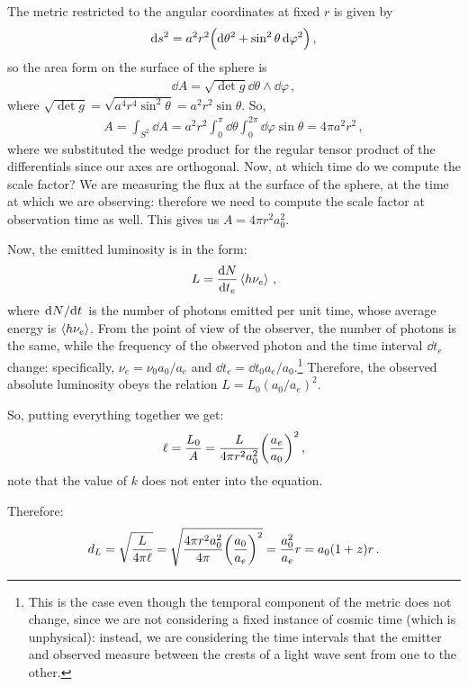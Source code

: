 \documentclass[main.tex]{subfiles}
\begin{document}
The metric restricted to the angular coordinates at fixed \(r\) is given by 
%
\begin{align}
\dd{s^2} = a^2 r^2 \qty(\dd{\theta^2} + \sin^2\theta \dd{\varphi^2})
\,,
\end{align}
%
so the area form on the surface of the sphere is 
%
\begin{align}
\dd{A} = \sqrt{ \det g} \dd{\theta } \wedge \dd{\varphi }
\,,
\end{align}
%
where \(\sqrt{ \det g} = \sqrt{a^{4} r^{4} \sin^2\theta } = a^2r^2 \sin \theta \). 
So,
%
\begin{align}
A = \int_{S^{2}}  \dd{A} = a^2r^2 \int_{0}^{\pi } \dd{\theta } \int_{0}^{2 \pi } \dd{\varphi } \sin \theta = 4 \pi a^2r^2 
\,,
\end{align}
%
where we substituted the wedge product for the regular tensor product of the differentials since our axes are orthogonal.
Now, at which time do we compute the scale factor? We are measuring the flux at the surface of the sphere, at the time at which we are observing: therefore we need to compute the scale factor at observation time as well. This gives us \(A = 4 \pi r^2a_0^2\).

Now, the emitted luminosity is in the form: 
%
\begin{align}
L = \dv{N}{t_{e}} \expval{h \nu_{e} }
\,,
\end{align}
%
where \(\dv*{N}{t}\) is the number of photons emitted per unit time, whose average energy is \(\expval{h \nu _e}\).
From the point of view of the observer, the number of photons is the same, while the frequency of the observed photon and the time interval \(\dd{t_{e}}\) change: specifically, \(\nu_{e} = \nu_0 a_0 / a_e\) and \(\dd{t_{e}} = \dd{t_0 } a_e / a_0 \).\footnote{This is the case even though the temporal component of the metric does not change, since we are not considering a fixed instance of cosmic time (which is unphysical): instead, we are considering the time intervals that the emitter and observed measure between the crests of a light wave sent from one to the other.}
Therefore, the observed absolute luminosity obeys the relation \(L= L_0 (a_0 / a_e)^2 \).

So, putting everything together we get:
%
\begin{equation}
  \ell = \frac{L_0 }{A} 
  = \frac{L}{4 \pi r^2 a_0 ^2} \qty(\frac{a_e}{a_0}) ^2
  \,,
\end{equation}
%
note that the value of \(k\) does not enter into the equation.

Therefore:
%
\begin{equation} \label{eq:luminosity-distance}
d_L = \sqrt{\frac{L}{4 \pi \ell}}
= \sqrt{\frac{4 \pi r^2a_0^2}{4 \pi } \qty(\frac{a_0}{a_e})^2}
= \frac{a_0^2}{a_e} r = a_0  (1+z) r\,.
\end{equation}
\end{document}
